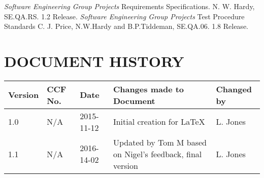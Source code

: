 \documentclass{project}
\begin{document}
\clearpage
{}
\begin{thebibliography}{2}
 \emph{Software Engineering Group Projects}
Requirements Specifications.
N. W. Hardy, SE.QA.RS. 1.2 Release.
 \emph{Software Engineering Group Projects}
Test Procedure Standards
C. J. Price, N.W.Hardy and B.P.Tiddeman, SE.QA.06. 1.8 Release.
\end{thebibliography}
\section*{DOCUMENT HISTORY}
\begin{tabular}{|l | l | l | p{8cm} |l | }
\hline
Version & CCF No. & Date & Changes made to Document & Changed by \\
\hline
1.0 & N/A & 2015-11-12 & Initial creation for LaTeX & L. Jones \\
\hline
1.1 & N/A & 2016-14-02 & Updated by Tom M based on Nigel's feedback, final version & L. Jones \\
\hline
\end{tabular}
\label{thelastpage}
\end{document}
